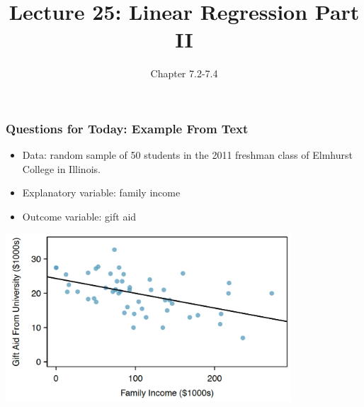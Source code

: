 \documentclass[slides]{beamer}
\title{Lecture 25: Linear Regression Part II}
\author{Chapter 7.2-7.4}
\date{}
\newcommand{\blue}[1]{\textcolor{blue2}{#1}}
\begin{document}
\begin{frame}
\titlepage
\end{frame}


%
%
%


\begin{frame}[fragile]
\frametitle{Questions for Today: Example From Text}
\begin{itemize}
\item Data: random sample of 50 students in the 2011 freshman class of Elmhurst College in Illinois.
\pause\item Explanatory variable: family income
\pause\item Outcome variable: gift aid
\end{itemize}

\begin{center}
\includegraphics[width=0.8\textwidth]{figure/regression.png}
\end{center}

\end{frame}
\end{document}
